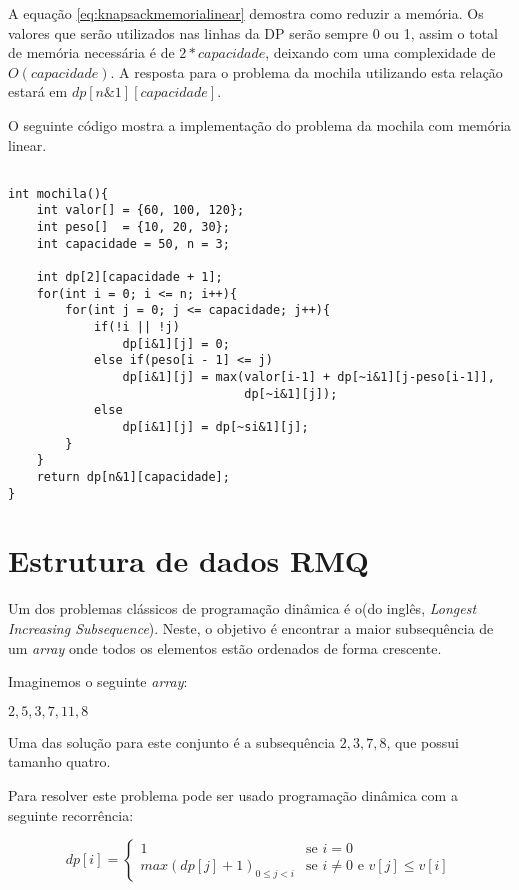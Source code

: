 A equação \ref{eq:knapsackmemorialinear} demostra como reduzir a memória. Os valores que serão utilizados nas linhas da DP serão sempre 0 ou 1, assim o total de memória necessária é de $2*capacidade$, deixando com uma complexidade de $O(capacidade)$. A resposta para o problema da mochila utilizando esta relação estará em $dp[n\&1][capacidade]$.

O seguinte código mostra a implementação do problema da mochila com memória linear.
\begin{lstlisting}[caption={Implementação Mochila},label={lst:lis}]

int mochila(){
	int valor[] = {60, 100, 120};
	int peso[]  = {10, 20, 30};
	int capacidade = 50, n = 3;
	
	int dp[2][capacidade + 1];
	for(int i = 0; i <= n; i++){
		for(int j = 0; j <= capacidade; j++){
			if(!i || !j)
				dp[i&1][j] = 0;
			else if(peso[i - 1] <= j)
				dp[i&1][j] = max(valor[i-1] + dp[~i&1][j-peso[i-1]],
				                 dp[~i&1][j]);
			else
				dp[i&1][j] = dp[~si&1][j];
		}
	}
	return dp[n&1][capacidade]; 
}
\end{lstlisting}

\section{Estrutura de dados RMQ}

Um dos problemas clássicos de programação dinâmica é o(do inglês, \textit{Longest Increasing Subsequence}). Neste, o objetivo é encontrar a maior subsequência de um \textit{array} onde todos os elementos estão ordenados de forma crescente.

Imaginemos o seguinte \textit{array}:

\begin{center}
	${2, 5, 3, 7, 11, 8}$
\end{center}

Uma das solução para este conjunto é a subsequência ${2, 3, 7, 8}$, que possui tamanho quatro.

Para resolver este problema pode ser usado programação dinâmica com a seguinte recorrência:

\begin{equation}
dp[i] = 
\begin{cases}
1 &\text{se } i = 0 \\
max(dp[j] + 1)_{0 \leq j < i} &\text{se } i \neq 0 \text{ e } v[j] \leq v[i]

\end{cases}
\label{eq:lisQuadrado}
\end{equation}

